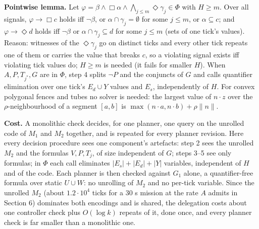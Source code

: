 \documentclass[10pt]{article}
\newcommand{\sect}[1]{\par\smallskip{\large\bfseries #1}\par\smallskip}
\begin{document}
\textbf{Pointwise lemma.} Let $\varphi=\beta\wedge\Box\alpha\wedge\bigwedge_{j\le m}\Diamond\gamma_j\in\Phi$ with $H\ge m$. Over all signals, $\varphi\to\Box c$ holds iff $\lnot\beta$, or $\alpha\cap\gamma_j=\emptyset$ for some $j\le m$, or $\alpha\subseteq c$; and $\varphi\to\Diamond d$ holds iff $\lnot\beta$ or $\alpha\cap\gamma_j\subseteq d$ for some $j\le m$ (sets of one tick's values). Reason: witnesses of the $\Diamond\gamma_j$ go on distinct ticks and every other tick repeats one of them or carries the value that breaks $c$, so a violating signal exists iff violating tick values do; $H\ge m$ is needed (it fails for smaller $H$). When $A,P,T_{j^*},G$ are in $\Phi$, step 4 splits $\lnot P$ and the conjuncts of $G$ and calls quantifier elimination over one tick's $E_d\cup Y$ values and $E_s$, independently of $H$. For convex polygonal fences and tubes no solver is needed: the largest value of $n\cdot z$ over the $\rho$-neighbourhood of a segment $[a,b]$ is $\max(n\cdot a,n\cdot b)+\rho\lVert n\rVert$.

\textbf{Cost.} A monolithic check decides, for one planner, one query on the unrolled code of $M_1$ and $M_2$ together, and is repeated for every planner revision. Here every decision procedure sees one component's artefacts: step 2 sees the unrolled $M_2$ and the formulas $V,P,T_j$, of size independent of $G$; steps 3--5 see only formulas; in $\Phi$ each call eliminates $|E_s|+|E_d|+|Y|$ variables, independent of $H$ and of the code. Each planner is then checked against $G_1$ alone, a quantifier-free formula over static $U\cup W$: no unrolling of $M_2$ and no per-tick variable. Since the unrolled $M_2$ (about $1.2\cdot10^4$ ticks for a $30$ s mission at the rate $A$ admits in Section 6) dominates both encodings and is shared, the delegation costs about one controller check plus $O(\log k)$ repeats of it, done once, and every planner check is far smaller than a monolithic one.

\sect{6\quad Worked example}
\end{document}
